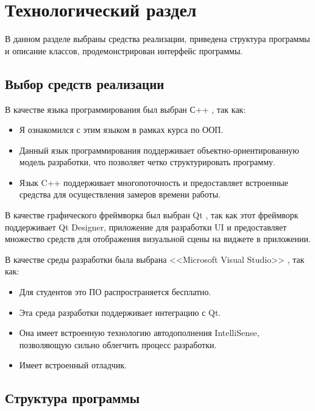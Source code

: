 \chapter{Технологический раздел}

В данном разделе выбраны средства реализации, приведена структура программы и описание классов, продемонстрирован интерфейс программы.

\section{Выбор средств реализации}

В качестве языка программирования был выбран С++ \cite{cpp-lang}, так как:
\begin{itemize}[label=---]
\item Я ознакомился с этим языком в рамках курса по ООП.
\item Данный язык программирования поддерживает \linebreak объектно-ориентированную модель разработки, что позволяет четко структурировать программу.
\item Язык C++ поддерживает многопоточность и предоставляет встроенные средства для осуществления замеров времени работы.
\end{itemize}

В качестве графического фреймворка был выбран Qt \cite{qt}, так как этот фреймворк поддерживает Qt Designer, приложение для разработки UI и предоставляет множество средств для отображения визуальной сцены на виджете в приложении.

В качестве среды разработки была выбрана <<Microsoft Visual Studio>> \cite{vs}, так как:

\begin{itemize}[label=---]
\item Для студентов это ПО распространяется бесплатно.
\item Эта среда разработки поддерживает интеграцию с Qt.
\item Она имеет встроенную технологию автодополнения IntelliSense\cite{intelli}, позволяющую сильно облегчить процесс разработки.
\item Имеет встроенный отладчик.
\end{itemize}

\section{Структура программы}

